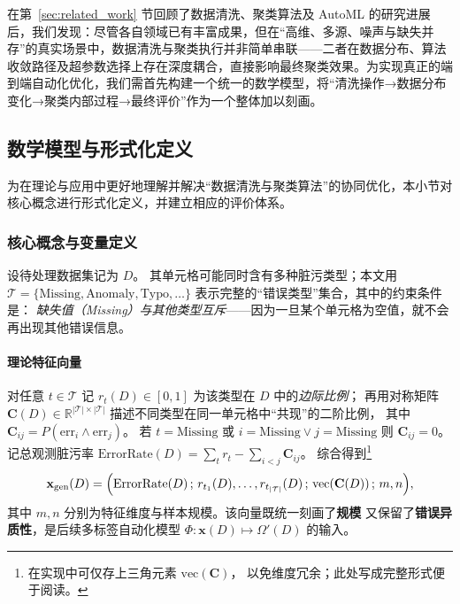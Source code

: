 \documentclass[10pt]{article} %
\numberwithin{equation}{section}
\begin{document}
\textcolor[rgb]{0.00,0.07,1.00}{}在第~\ref{sec:related_work} 节回顾了数据清洗、聚类算法及 AutoML 的研究进展后，我们发现：尽管各自领域已有丰富成果，但在“高维、多源、噪声与缺失并存”的真实场景中，数据清洗与聚类执行并非简单串联——二者在数据分布、算法收敛路径及超参数选择上存在深度耦合，直接影响最终聚类效果。为实现真正的端到端自动化优化，我们需首先构建一个统一的数学模型，将“清洗操作→数据分布变化→聚类内部过程→最终评价”作为一个整体加以刻画。


\subsection{数学模型与形式化定义}\label{subsec:formal-definition}

为在理论与应用中更好地理解并解决“数据清洗与聚类算法”的协同优化，本小节对核心概念进行形式化定义，并建立相应的评价体系。

\subsubsection{核心概念与变量定义}
\label{subsec:core-def}
\textcolor[rgb]{0.00,0.07,1.00}{
设待处理数据集记为 \(D\)。  
其单元格可能同时含有多种脏污类型；本文用  
\(\mathcal{T}\!=\!\{\text{Missing},\text{Anomaly},\text{Typo},\dots\}\)  
表示完整的“错误类型”集合，其中的约束条件是：  
\emph{缺失值（Missing）与其他类型互斥}——因为一旦某个单元格为空值，就不会再出现其他错误信息。}

\vspace{0.3em}
\paragraph{\textcolor[rgb]{0.00,0.07,1.00}{理论特征向量}}
\textcolor[rgb]{0.00,0.07,1.00}{对任意 \(t\!\in\!\mathcal{T}\) 记
\(r_t(D)\in[0,1]\) 为该类型在 \(D\) 中的\emph{边际比例}；  
再用对称矩阵 \(\mathbf{C}(D)\in\mathbb{R}^{|\mathcal{T}|\times|\mathcal{T}|}\)  
描述不同类型在同一单元格中“共现”的二阶比例，
其中 \(\mathbf{C}_{ij}=P(\text{err}_i\land\text{err}_j)\)。
若 \(t=\text{Missing}\) 或 \(i=\text{Missing}\vee j=\text{Missing}\) 则  
\(\mathbf{C}_{ij}=0\)。记总观测脏污率
\(\mathrm{ErrorRate}(D)=\sum_{t}r_t-\sum_{i<j}\mathbf{C}_{ij}\)。  
综合得到\footnote{%
在实现中可仅存上三角元素 \(\mathrm{vec}(\mathbf{C})\)，
以免维度冗余；此处写成完整形式便于阅读。}  
\begin{equation}\label{eq:xD}
  \mathbf{x}_{\mathrm{gen}}(D)=
  \Bigl(
     \mathrm{ErrorRate}(D)\,;\,
     r_{t_1}(D),\ldots,r_{t_{|\mathcal{T}|}}(D)\,;\,
     \mathrm{vec}(\mathbf{C}(D))\,;\,
     m,n
  \Bigr),
\end{equation}
其中 \(m,n\) 分别为特征维度与样本规模。该向量既统一刻画了\textbf{规模}
又保留了\textbf{错误异质性}，是后续多标签自动化模型
\(\Phi:\mathbf{x}(D)\mapsto\Omega'(D)\) 的输入。}
\end{document}
